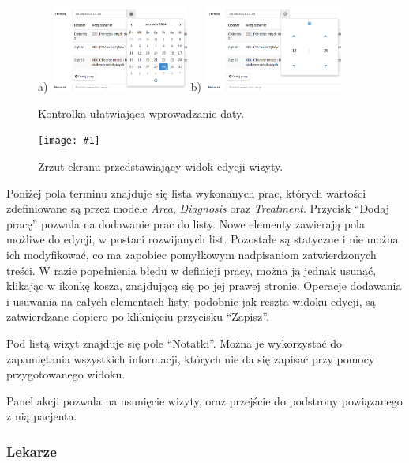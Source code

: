 \documentclass[11pt]{aghdpl}
\newcommand{\fullWidthPicture}[2]{
\begin{figure}[h!]
	\centering
		\texttt{[image: \#1]}
	\caption{#2}
	\label{fig:#1}
\end{figure}
}
\begin{document}
\begin{figure}[h!]
	\begin{center}
		a)~\includegraphics[width=0.4\textwidth]{datePickerDate}
		\hspace{5mm}
		b)~\includegraphics[width=0.4\textwidth]{datePickerTime}
	\end{center}
	\caption{Kontrolka ułatwiająca wprowadzanie daty.}
	\label{fig:datepicker}
\end{figure}

\fullWidthPicture{wizyta}{Zrzut ekranu przedstawiający widok edycji wizyty.}

Poniżej pola terminu znajduje się lista wykonanych prac, których wartości zdefiniowane są przez modele \emph{Area}, \emph{Diagnosis} oraz \emph{Treatment}. Przycisk ``Dodaj pracę'' pozwala na dodawanie prac do listy. Nowe elementy zawierają pola możliwe do edycji, w postaci rozwijanych list. Pozostałe są statyczne i nie można ich modyfikować, co ma zapobiec pomyłkowym nadpisaniom zatwierdzonych treści. W razie popełnienia błędu w definicji pracy, można ją jednak usunąć, klikając w ikonkę kosza, znajdującą się po jej prawej stronie. Operacje dodawania i usuwania na całych elementach listy, podobnie jak reszta widoku edycji, są zatwierdzane dopiero po kliknięciu przycisku ``Zapisz''.

Pod listą wizyt znajduje się pole ``Notatki''. Można je wykorzystać do zapamiętania wszystkich informacji, których nie da się zapisać przy pomocy przygotowanego widoku.

Panel akcji pozwala na usunięcie wizyty, oraz przejście do podstrony powiązanego z nią pacjenta.


\subsubsection{Lekarze}
\label{sec:lekarze}
\end{document}
